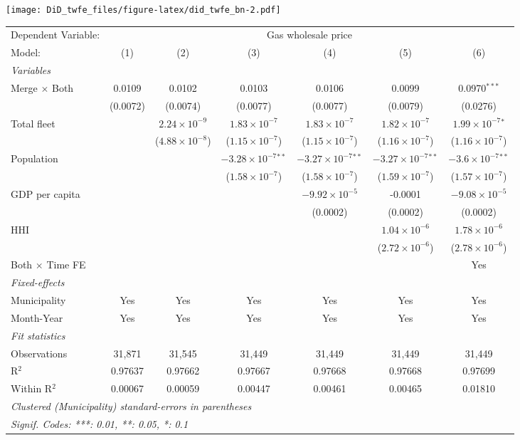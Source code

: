 \documentclass[
]{article}
\begin{document}
\texttt{[image: DiD\_twfe\_files/figure-latex/did\_twfe\_bn-2.pdf]}

\begin{tabular}{lcccccc}
\tabularnewline\midrule\midrule
Dependent Variable:&\multicolumn{6}{c}{Gas wholesale price}\\
Model:&(1) & (2) & (3) & (4) & (5) & (6)\\
\midrule \emph{Variables}&   &   &   &   &   &  \\
Merge $\times $ Both & 0.0109 & 0.0102 & 0.0103 & 0.0106 & 0.0099 & 0.0970$^{***}$\\
  &(0.0072) & (0.0074) & (0.0077) & (0.0077) & (0.0079) & (0.0276)\\
Total fleet &    & $2.24\times 10^{-9}$ & $1.83\times 10^{-7}$ & $1.83\times 10^{-7}$ & $1.82\times 10^{-7}$ & $1.99\times 10^{-7}$$^{*}$\\
  &   & ($4.88\times 10^{-8}$) & ($1.15\times 10^{-7}$) & ($1.15\times 10^{-7}$) & ($1.16\times 10^{-7}$) & ($1.16\times 10^{-7}$)\\
Population &    &    & $-3.28\times 10^{-7}$$^{**}$ & $-3.27\times 10^{-7}$$^{**}$ & $-3.27\times 10^{-7}$$^{**}$ & $-3.6\times 10^{-7}$$^{**}$\\
  &   &    & ($1.58\times 10^{-7}$) & ($1.58\times 10^{-7}$) & ($1.59\times 10^{-7}$) & ($1.57\times 10^{-7}$)\\
GDP per capita &    &    &    & $-9.92\times 10^{-5}$ & -0.0001 & $-9.08\times 10^{-5}$\\
  &   &    &    & (0.0002) & (0.0002) & (0.0002)\\
HHI &    &    &    &    & $1.04\times 10^{-6}$ & $1.78\times 10^{-6}$\\
  &   &    &    &    & ($2.72\times 10^{-6}$) & ($2.78\times 10^{-6}$)\\
Both $\times$ Time FE &  &  &  &  &  & Yes\\
\midrule \emph{Fixed-effects}&   &   &   &   &   &  \\
Municipality & Yes & Yes & Yes & Yes & Yes & Yes\\
Month-Year & Yes & Yes & Yes & Yes & Yes & Yes\\
\midrule \emph{Fit statistics}&  & & & & & \\
Observations & 31,871&31,545&31,449&31,449&31,449&31,449\\
R$^2$ & 0.97637&0.97662&0.97667&0.97668&0.97668&0.97699\\
Within R$^2$ & 0.00067&0.00059&0.00447&0.00461&0.00465&0.01810\\
\midrule\midrule\multicolumn{7}{l}{\emph{Clustered (Municipality) standard-errors in parentheses}}\\
\multicolumn{7}{l}{\emph{Signif. Codes: ***: 0.01, **: 0.05, *: 0.1}}\\
\end{tabular}
\end{document}
